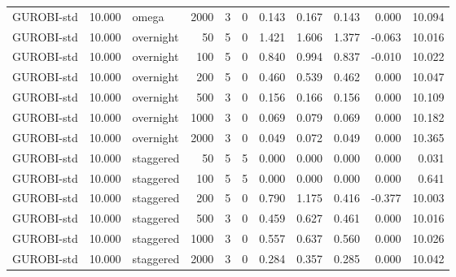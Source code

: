 \begin{table}[htbp]
\begin{tabular}{lrlrrlrrrrr}
GUROBI-std & 10.000 & omega & 2000 & 3 & 0 & 0.143 & 0.167 & 0.143 & 0.000 & 10.094 \\
GUROBI-std & 10.000 & overnight & 50 & 5 & 0 & 1.421 & 1.606 & 1.377 & -0.063 & 10.016 \\
GUROBI-std & 10.000 & overnight & 100 & 5 & 0 & 0.840 & 0.994 & 0.837 & -0.010 & 10.022 \\
GUROBI-std & 10.000 & overnight & 200 & 5 & 0 & 0.460 & 0.539 & 0.462 & 0.000 & 10.047 \\
GUROBI-std & 10.000 & overnight & 500 & 3 & 0 & 0.156 & 0.166 & 0.156 & 0.000 & 10.109 \\
GUROBI-std & 10.000 & overnight & 1000 & 3 & 0 & 0.069 & 0.079 & 0.069 & 0.000 & 10.182 \\
GUROBI-std & 10.000 & overnight & 2000 & 3 & 0 & 0.049 & 0.072 & 0.049 & 0.000 & 10.365 \\
GUROBI-std & 10.000 & staggered & 50 & 5 & 5 & 0.000 & 0.000 & 0.000 & 0.000 & 0.031 \\
GUROBI-std & 10.000 & staggered & 100 & 5 & 5 & 0.000 & 0.000 & 0.000 & 0.000 & 0.641 \\
GUROBI-std & 10.000 & staggered & 200 & 5 & 0 & 0.790 & 1.175 & 0.416 & -0.377 & 10.003 \\
GUROBI-std & 10.000 & staggered & 500 & 3 & 0 & 0.459 & 0.627 & 0.461 & 0.000 & 10.016 \\
GUROBI-std & 10.000 & staggered & 1000 & 3 & 0 & 0.557 & 0.637 & 0.560 & 0.000 & 10.026 \\
GUROBI-std & 10.000 & staggered & 2000 & 3 & 0 & 0.284 & 0.357 & 0.285 & 0.000 & 10.042 \\
\bottomrule
\end{tabular}
\end{table}
